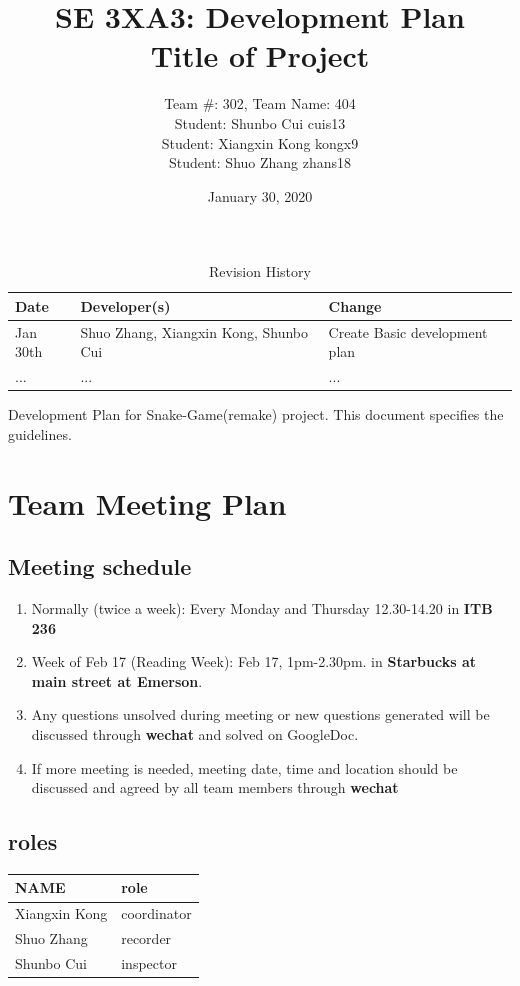 \documentclass{article}
\title{SE 3XA3: Development Plan\\Title of Project}
\author{Team \#: 302, Team Name: 404
		\\ Student: Shunbo Cui	cuis13
		\\ Student: Xiangxin Kong	kongx9
		\\ Student: Shuo Zhang	zhans18
}
\date{January 30, 2020}
\begin{document}
\begin{table}[hp]
\caption{Revision History} \label{TblRevisionHistory}
\begin{tabularx}{\textwidth}{llX}
\toprule
\textbf{Date} & \textbf{Developer(s)} & \textbf{Change}\\
\midrule
Jan 30th & Shuo Zhang, Xiangxin Kong, Shunbo Cui & Create Basic development plan\\
... & ... & ...\\
\bottomrule
\end{tabularx}
\end{table}

\newpage

\maketitle

Development Plan for Snake-Game(remake) project. This document specifies the guidelines.

\section{Team Meeting Plan}
\subsection{Meeting schedule}
\begin{enumerate}
    \item Normally (twice a week): Every Monday and Thursday  12.30-14.20 in \textbf{ITB 236}
    \item Week of Feb 17 (Reading Week): Feb 17, 1pm-2.30pm. in \textbf{Starbucks at main street at Emerson}.
	\item Any questions unsolved during meeting or new questions generated will be discussed through \textbf{wechat} and solved on GoogleDoc.
    \item If more meeting is needed, meeting date, time and location should be discussed and agreed by all team members through \textbf{wechat}
\end{enumerate}
\subsection{roles}

    \begin{tabular}{ |l|l| }
        \toprule
        \textbf{NAME} & \textbf{role} \\
        \midrule
        Xiangxin Kong & coordinator \\
        \midrule
        Shuo Zhang & recorder \\
        \midrule
        Shunbo Cui & inspector \\
        \bottomrule
    \end{tabular}
\end{document}
